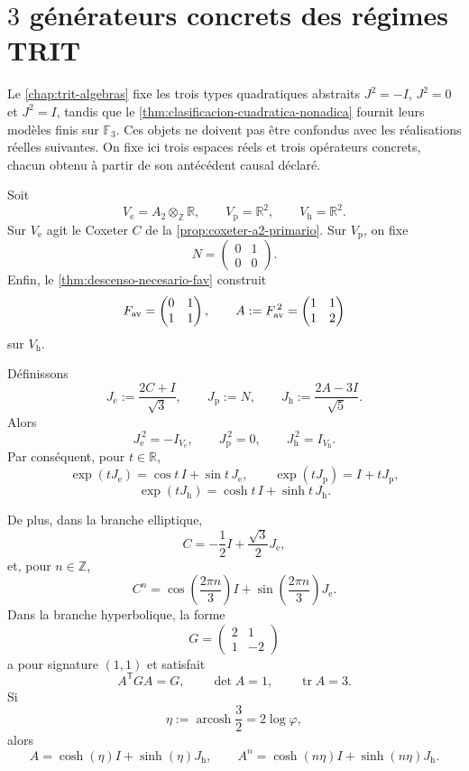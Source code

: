 \section{\(3\) générateurs concrets des régimes TRIT}
\label{sec:tres-generadores-concretos-trit}

Le \cref{chap:trit-algebras} fixe les trois types quadratiques abstraits
\(J^2=-I\), \(J^2=0\) et \(J^2=I\), tandis que le
\cref{thm:clasificacion-cuadratica-nonadica} fournit leurs modèles finis
sur \(\mathbb F_3\). Ces objets ne doivent pas être confondus avec les
réalisations réelles suivantes. On fixe ici trois espaces réels et trois
opérateurs concrets, chacun obtenu à partir de son antécédent causal déclaré.

Soit
\[
V_{\mathrm e}=A_2\otimes_{\mathbb Z}\mathbb R,
\qquad
V_{\mathrm p}=\mathbb R^2,
\qquad
V_{\mathrm h}=\mathbb R^2.
\]
Sur \(V_{\mathrm e}\) agit le Coxeter \(C\) de la
\cref{prop:coxeter-a2-primario}. Sur \(V_{\mathrm p}\), on fixe
\[
N=
\begin{pmatrix}
0&1\\
0&0
\end{pmatrix}.
\]
Enfin, le \cref{thm:descenso-necesario-fav} construit
\[
F_{\rm av}=
\begin{pmatrix}
0&1\\
1&1
\end{pmatrix},
\qquad
A:=F_{\rm av}^{\,2}=
\begin{pmatrix}
1&1\\
1&2
\end{pmatrix}
\]
sur \(V_{\mathrm h}\).

\begin{theorem}
\label{thm:tres-generadores-concretos-trit}
Définissons
\[
J_{\mathrm e}:=\frac{2C+I}{\sqrt3},
\qquad
J_{\mathrm p}:=N,
\qquad
J_{\mathrm h}:=\frac{2A-3I}{\sqrt5}.
\]
Alors
\[
J_{\mathrm e}^{\,2}=-I_{V_{\mathrm e}},
\qquad
J_{\mathrm p}^{\,2}=0,
\qquad
J_{\mathrm h}^{\,2}=I_{V_{\mathrm h}}.
\]
Par conséquent, pour \(t\in\mathbb R\),
\[
\exp(tJ_{\mathrm e})
=\cos t\,I+\sin t\,J_{\mathrm e},
\qquad
\exp(tJ_{\mathrm p})
=I+tJ_{\mathrm p},
\]
\[
\exp(tJ_{\mathrm h})
=\cosh t\,I+\sinh t\,J_{\mathrm h}.
\]

De plus, dans la branche elliptique,
\[
C=-\frac12I+\frac{\sqrt3}{2}J_{\mathrm e},
\]
et, pour \(n\in\mathbb Z\),
\[
C^n=
\cos\!\left(\frac{2\pi n}{3}\right)I
+\sin\!\left(\frac{2\pi n}{3}\right)J_{\mathrm e}.
\]
Dans la branche hyperbolique, la forme
\[
G=
\begin{pmatrix}
2&1\\
1&-2
\end{pmatrix}
\]
a pour signature \((1,1)\) et satisfait
\[
A^{\mathsf T}GA=G,\qquad
\det A=1,\qquad
\operatorname{tr}A=3.
\]
Si
\[
\eta:=\operatorname{arcosh}\frac32=2\log\varphi,
\]
alors
\[
A=\cosh(\eta)I+\sinh(\eta)J_{\mathrm h},
\qquad
A^n=\cosh(n\eta)I+\sinh(n\eta)J_{\mathrm h}.
\]
\end{theorem}

